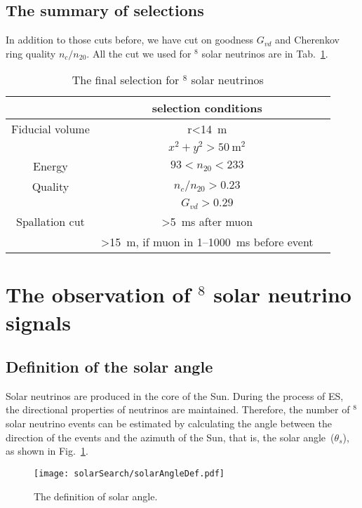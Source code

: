 \subsection{The summary of selections}
In addition to those cuts before, we have cut on goodness $G_{vd}$ and Cherenkov ring quality $n_c/n_{20}$. All the cut we used for $^8$ solar neutrinos are in Tab.~\ref{tab:selection_summary}.
\begin{table}[htbp]
	\centering
	\caption{The final selection for $^8$ solar neutrinos}%
	\label{tab:selection_summary}
	\begin{tabular}{ccc}
		\toprule
		                & selection conditions                                  \\
		\midrule
		Fiducial volume & r<\SI{14}{m}                                          \\
		                & $x^2+y^2>50~\text{m}^2$                               \\
		Energy          & $93<n_{20}<233$                                       \\
		Quality         & $n_c/n_{20}>0.23$                                     \\
		                & $G_{vd}>0.29$                                         \\
		Spallation cut  & >\SI{5}{ms} after muon                                \\
		                & >\SI{15}{m}, if muon in 1--\SI{1000}{ms} before event \\
		\bottomrule
	\end{tabular}
\end{table}

\section{The observation of $^8$ solar neutrino signals}
\subsection{Definition of the solar angle}
Solar neutrinos are produced in the core of the Sun. During the process of ES, the directional properties of neutrinos are maintained. Therefore, the number of $^8$ solar neutrino events can be estimated by calculating the angle between the direction of the events and the azimuth of the Sun, that is, the solar angle~($\theta_s$), as shown in Fig.~\ref{fig:solar_angle_define}.
\begin{figure}[htbp]
	\centering
	\texttt{[image: solarSearch/solarAngleDef.pdf]}
	\caption{The definition of solar angle.}
	\label{fig:solar_angle_define}
\end{figure}
